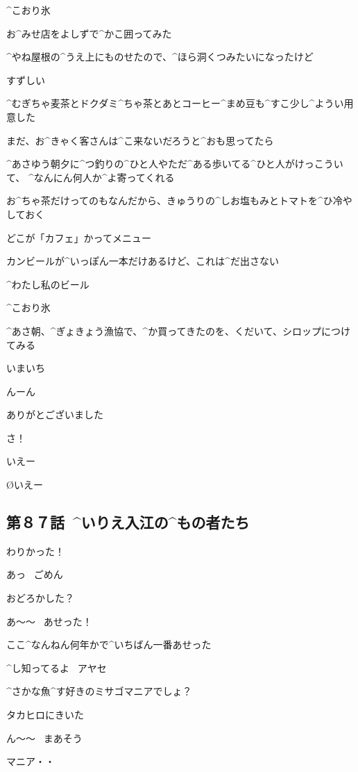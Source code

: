 \page[131]
\Sign ^{こおり}{氷}

\A お^{みせ}{店}をよしずで^{かこ}{囲}ってみた

\page
\A ^{やね}{屋根}の^{うえ}{上}にものせたので、^{ほら}{洞}くつみたいになったけど

\A すずしい

\A ^{むぎちゃ}{麦茶}とドクダミ^{ちゃ}{茶}とあとコーヒー^{まめ}{豆}も^{すこ}{少}し^{ようい}{用意}した

\A まだ、お^{きゃく}{客}さんは^{こ}{来}ないだろうと^{おも}{思}ってたら

\A ^{あさゆう}{朝夕}に^{つ}{釣}りの^{ひと}{人}やただ^{ある}{歩}いてる^{ひと}{人}がけっこういて、
^{なんにん}{何人}か^{よ}{寄}ってくれる

\page
\A お^{ちゃ}{茶}だけってのもなんだから、きゅうりの^{しお}{塩}もみとトマトを^{ひ}{冷}やしておく

\A どこが「カフェ」かってメニュー

\A カンビールが^{いっぽん}{一本}だけあるけど、これは^{だ}{出}さない

\A ^{わたし}{私}のビール

\page
\A ^{こおり}{氷}

\A ^{あさ}{朝}、^{ぎょきょう}{漁協}で、^{か}{買}ってきたのを、くだいて、シロップにつけてみる

\A いまいち

\A んーん

\page
\A ありがとございました

\A さ！

\page
\A いえー

\O いえー


\subsection{第８７話\ ^{いりえ}{入江}の^{もの}{者}たち}

\page[141]
\Y わりかった！

\page[144]
\M あっ
\ ごめん

\M おどろかした？

\page
\Y あ〜〜
\ あせった！

\Y ここ^{なんねん}{何年}かで^{いちばん}{一番}あせった

\M ^{し}{知}ってるよ
\ アヤセ

\M ^{さかな}{魚}^{す}{好}きのミサゴマニアでしょ？

\M タカヒロにきいた

\Y ん〜〜
\ まあそう

\Y マニア・・

